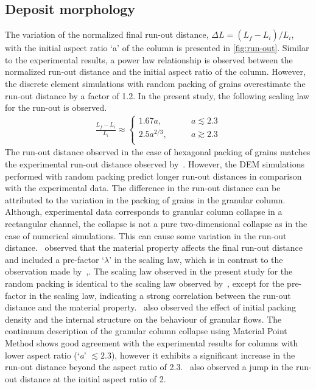 \subsection{Deposit morphology}
The variation of the normalized final run-out distance, $\Delta L = 
(L_{\textit{f}}-L_{\textit{i}})/L_{\textit{i}}$, with the initial aspect ratio 
`a' of the column is presented in \cref{fig:run-out}. Similar to the 
experimental results, a power law relationship is observed between the 
normalized run-out distance and the initial aspect ratio of the column. 
However, the discrete element simulations with random packing of grains 
overestimate the run-out distance by a factor of 1.2. In the present study, the 
following scaling law for the run-out is observed.
\begin{align}
\frac{L_{\textit{f}}-L_{\textit{i}}}{L_{\textit{i}}} \approx  
\begin{cases}
1.67 a, &\qquad \textit{a}\lesssim 2.3 \\
2.5 a^{2/3}, &\qquad \textit{a} \gtrsim 2.3 \\
\end{cases}
\end{align}
The run-out distance observed in the case of hexagonal packing of grains 
matches the experimental run-out distance observed by~\citet{Lajeunesse2004}. 
However, the DEM simulations performed with random packing 
predict longer run-out distances in comparison with the experimental data. The 
difference in the run-out distance can be attributed to the variation in the 
packing of grains in the granular column. Although, experimental data 
corresponds to granular column collapse in a rectangular channel, the collapse 
is not a pure two-dimensional collapse as in the case of numerical simulations. 
This can cause some variation in the run-out distance.~\citet{Balmforth2005} 
observed that the material property affects the final run-out distance and 
included a pre-factor `$\lambda$' in the scaling law, which is in contrast to 
the observation made by~\citet{Lube2005},. The scaling law observed in the 
present study for the random packing is identical to the scaling law observed 
by~\citet{Lajeunesse2004}, except for the pre-factor in the scaling law, 
indicating a strong correlation between the run-out distance and the material 
property.~\citet{Daerr1999} also observed the effect of initial packing density 
and the internal structure on the behaviour of granular flows. The continuum 
description of the granular column collapse using Material Point Method shows 
good agreement with the experimental results for columns with lower aspect 
ratio (`\textit{a}' $\lesssim 2.3$), however it exhibits a significant increase 
in the run-out distance beyond the aspect ratio of 2.3.~\citet{Bandara2013} 
also observed a jump in the run-out distance at the initial aspect ratio of 2.

